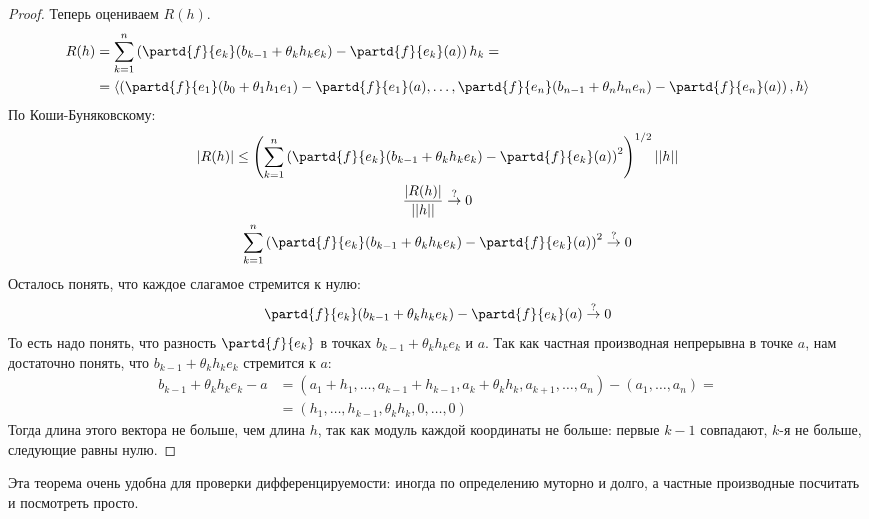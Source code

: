 \begin{proof}
	Теперь оцениваем $R(h)$.
	\begin{align*}
	R(h) &= \sum_{k=1}^n \left( \partd{f}{e_k} (b_{k-1}+\theta_k h_k e_k) - \partd{f}{e_k}(a) \right)h_k = \\
			 &= \left<\left(\partd{f}{e_1}(b_0+\theta_1 h_1 e_1) - \partd{f}{e_1}(a), \dots, \partd{f}{e_n}(b_{n-1}+\theta_n h_n e_n) - \partd{f}{e_n}(a) \right), h\right>
	\end{align*}
	По Коши-Буняковскому:
	\begin{gather*}
	|R(h)| \le \left( \sum_{k=1}^n \left( \partd{f}{e_k} (b_{k-1}+\theta_k h_k e_k) - \partd{f}{e_k}(a) \right)^2 \right)^{1/2} ||h|| \\
	\frac{|R(h)|}{||h||} \stackrel{?}{\to} 0 \\
	\sum_{k=1}^n \left( \partd{f}{e_k} (b_{k-1}+\theta_k h_k e_k) - \partd{f}{e_k}(a) \right)^2 \stackrel{?}{\to} 0
	\end{gather*}
	Осталось понять, что каждое слагамое стремится к нулю:
	\[
	\partd{f}{e_k} (b_{k-1}+\theta_k h_k e_k) - \partd{f}{e_k}(a) \stackrel{?}{\to} 0
	\]
	То есть надо понять, что разность $\partd{f}{e_k}$ в точках $b_{k-1}+\theta_k h_k e_k$ и $a$.
	Так как частная производная непрерывна в точке $a$, нам достаточно понять, что $b_{k-1}+\theta_k h_k e_k$ стремится к $a$:
	\begin{align*}
	b_{k-1}+\theta_k h_k e_k - a &= (a_1+h_1, \dots, a_{k-1}+h_{k-1}, a_k + \theta_k h_k, a_{k+1}, \dots, a_n) - (a_1, \dots, a_n) = \\
	                         &= (h_1, \dots, h_{k-1}, \theta_k h_k, 0, \dots, 0)
	\end{align*}
	Тогда длина этого вектора не больше, чем длина $h$, так как модуль каждой координаты не больше:
	первые $k-1$ совпадают, $k$-я не больше, следующие равны нулю.

\end{proof}
\begin{Rem}
	Эта теорема очень удобна для проверки дифференцируемости: иногда по определению муторно и долго, а частные производные посчитать и посмотреть просто.
\end{Rem}

